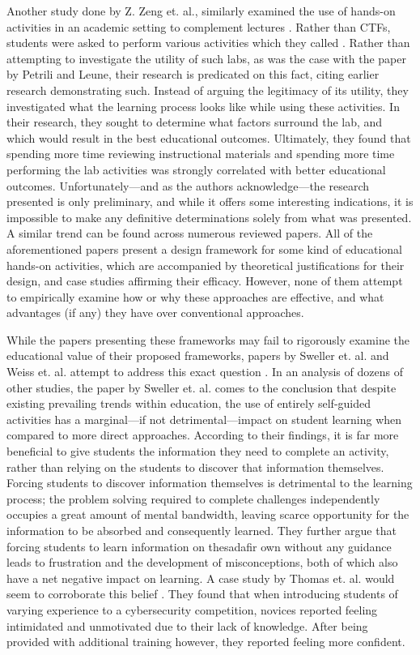 \documentclass{article}
\begin{document}
    Another study done by Z. Zeng et. al., similarly examined the use of hands-on activities in an academic setting to complement lectures \cite{Z-Zeng}. Rather than CTFs, students were asked to perform various activities which they called . Rather than attempting to investigate the utility of such labs, as was the case with the paper by Petrili and Leune, their research is predicated on this fact, citing earlier research demonstrating such. Instead of arguing the legitimacy of its utility, they investigated what the learning process looks like while using these activities. In their research, they sought to determine what factors surround the lab, and which would result in the best educational outcomes. Ultimately, they found that spending more time reviewing instructional materials and spending more time performing the lab activities was strongly correlated with better educational outcomes. Unfortunately---and as the authors acknowledge---the research presented is only preliminary, and while it offers some interesting indications, it is impossible to make any definitive determinations solely from what was presented. A similar trend can be found across numerous reviewed papers\cite{Y-Deng,W-Du,N-Eliot}. All of the aforementioned papers present a design framework for some kind of educational hands-on activities, which are accompanied by theoretical justifications for their design, and case studies affirming their efficacy. However, none of them attempt to empirically examine how or why these approaches are effective, and what advantages (if any) they have over conventional approaches. 

    While the papers presenting these frameworks may fail to rigorously examine the educational value of their proposed frameworks, papers by Sweller et. al. and Weiss et. al. attempt to address this exact question \cite{J-Sweller,R-Weiss}. In an analysis of dozens of other studies, the paper by Sweller et. al. comes to the conclusion that despite existing prevailing trends within education, the use of entirely self-guided activities has a marginal---if not detrimental---impact on student learning when compared to more direct approaches. According to their findings, it is far more beneficial to give students the information they need to complete an activity, rather than relying on the students to discover that information themselves. 
    Forcing students to discover information themselves is detrimental to the learning process; the problem solving required to complete challenges independently occupies a great amount of mental bandwidth, leaving scarce opportunity for the information to be absorbed and consequently learned. 
    They further argue that forcing students to learn information on thesadafir own without any guidance leads to frustration and the development of misconceptions, both of which also have a net negative impact on learning. 
    A case study by Thomas et. al. would seem to corroborate this belief \cite{L-Thomas}. They found that when introducing students of varying experience to a cybersecurity competition, novices reported feeling intimidated and unmotivated due to their lack of knowledge. After being provided with additional training however, they reported feeling more confident. 
\end{document}
